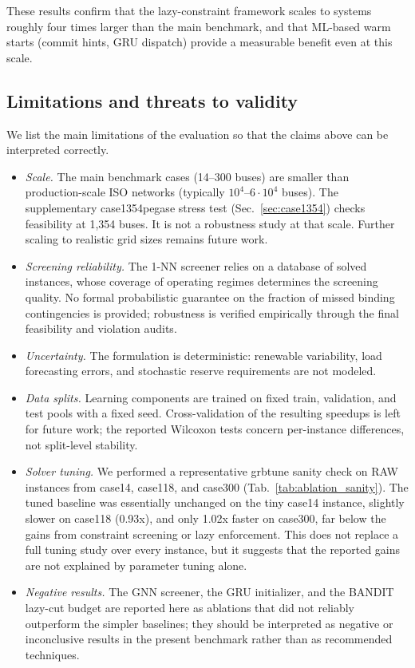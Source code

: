 \documentclass[runningheads]{llncs}
\begin{document}
These results confirm that the lazy-constraint framework scales to systems roughly four times larger than the main benchmark, and that ML-based warm starts (commit hints, GRU dispatch) provide a measurable benefit even at this scale.

\subsection{Limitations and threats to validity}
\label{sec:limitations}

We list the main limitations of the evaluation so that the claims above can be interpreted correctly.
\begin{itemize}
    \item \emph{Scale.} The main benchmark cases (14--300 buses) are smaller than production-scale ISO networks (typically $10^4$--$6\!\cdot\!10^4$ buses). The supplementary case1354pegase stress test (Sec.~\ref{sec:case1354}) checks feasibility at 1{,}354 buses. It is not a robustness study at that scale. Further scaling to realistic grid sizes remains future work.
    \item \emph{Screening reliability.} The 1-NN screener relies on a database of solved instances, whose coverage of operating regimes determines the screening quality. No formal probabilistic guarantee on the fraction of missed binding contingencies is provided; robustness is verified empirically through the final feasibility and violation audits.
    \item \emph{Uncertainty.} The formulation is deterministic: renewable variability, load forecasting errors, and stochastic reserve requirements are not modeled.
    \item \emph{Data splits.} Learning components are trained on fixed train, validation, and test pools with a fixed seed. Cross-validation of the resulting speedups is left for future work; the reported Wilcoxon tests concern per-instance differences, not split-level stability.
    \item \emph{Solver tuning.} We performed a representative grbtune sanity check on RAW instances from case14, case118, and case300 (Tab.~\ref{tab:ablation_sanity}). The tuned baseline was essentially unchanged on the tiny case14 instance, slightly slower on case118 (0.93x), and only 1.02x faster on case300, far below the gains from constraint screening or lazy enforcement. This does not replace a full tuning study over every instance, but it suggests that the reported gains are not explained by parameter tuning alone.
    \item \emph{Negative results.} The GNN screener, the GRU initializer, and the BANDIT lazy-cut budget are reported here as ablations that did not reliably outperform the simpler baselines; they should be interpreted as negative or inconclusive results in the present benchmark rather than as recommended techniques.
\end{itemize}
\end{document}
